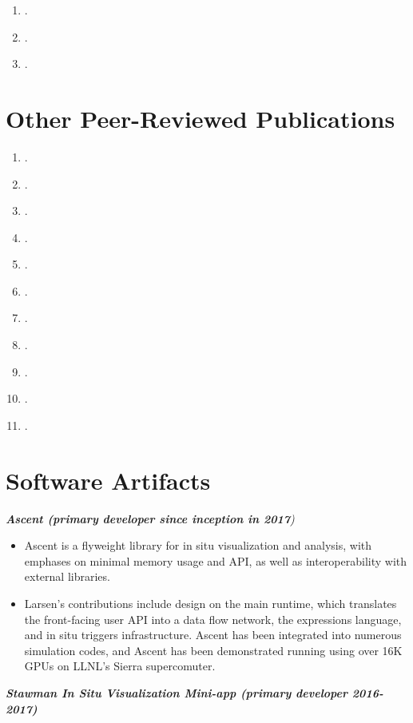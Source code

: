 \documentclass[margin,line]{res}
\begin{document}
\begin{resume}
\begin{enumerate}
	\item {}.
	\item {}.
	\item {}.


\end{enumerate}
\section{\sc Other Peer-Reviewed Publications}
\begin{enumerate}[resume]
	\item {}.
	\item {}.
	\item {}.
	\item {}.
	\item {}.
	\item {}.
	\item {}.
	\item {}.
	\item {}.
	\item {}.
	\item {}.
\end{enumerate}

\section{\sc Software Artifacts}
{\em \textbf{Ascent (primary developer since inception in 2017}) }
\begin{itemize}
	\item Ascent is a flyweight library for in situ visualization and analysis, with emphases on minimal
	memory usage and API, as well as interoperability with external libraries.
	\item Larsen's contributions include design on the main runtime, which translates the front-facing user API into a data flow network, the expressions language, and in situ triggers infrastructure. Ascent has been integrated into numerous simulation codes, and Ascent has been demonstrated running using over 16K GPUs on LLNL's Sierra supercomuter.
\end{itemize}

{\em \textbf{Stawman In Situ Visualization Mini-app (primary developer 2016-2017)} }


\end{resume}
\end{document}
